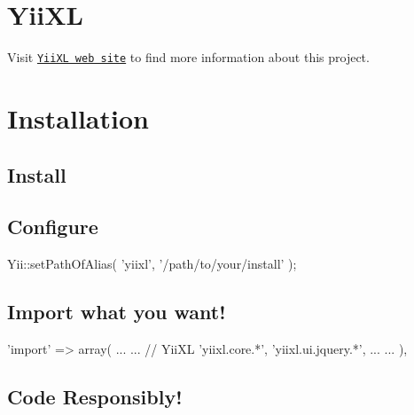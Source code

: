 \hypertarget{main_intro_sec}{}\section{YiiXL}\label{main_intro_sec}
Visit \href{http://yiixl.com}{\tt YiiXL web site} to find more information about this project. \hypertarget{main_install_sec}{}\section{Installation}\label{main_install_sec}
\hypertarget{main_step1}{}\subsection{Install}\label{main_step1}
\hypertarget{main_step2}{}\subsection{Configure}\label{main_step2}

\begin{DoxyCode}
    Yii::setPathOfAlias( 'yiixl', '/path/to/your/install' );
\end{DoxyCode}
 \hypertarget{main_step3}{}\subsection{Import what you want!}\label{main_step3}

\begin{DoxyCode}
    'import' => array(
      ...
      ...
      //  YiiXL
      'yiixl.core.*',
      'yiixl.ui.jquery.*',
      ...
      ...
    ),
\end{DoxyCode}
 \hypertarget{main_step4}{}\subsection{Code Responsibly!}\label{main_step4}
